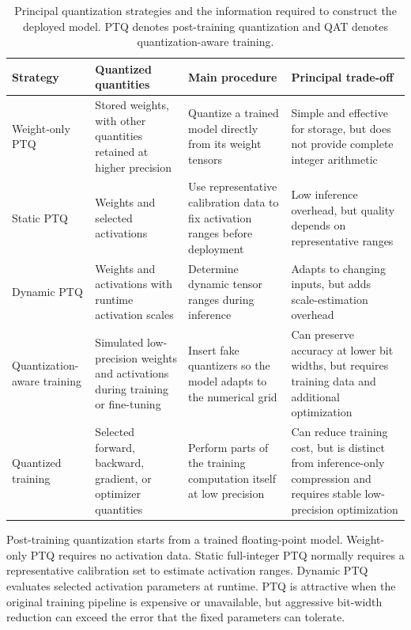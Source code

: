 \documentclass[
    a4paper,
    12pt,
    titlepage,
    bibliography=totoc,
    twoside=on,
    parskip=false,
    numbers=noenddot,
    cleardoublepage=empty,
    DIV=12,
    BCOR=12.0mm,
    headheight=36pt,
    headings=openright
]{scrreprt}
\begin{document}
\begin{table}[htbp]
    \centering
    \small
    \caption[Principal neural-network quantization strategies.]{Principal quantization strategies and the information required to construct the deployed model. PTQ denotes post-training quantization and QAT denotes quantization-aware training.}
    \label{tab:fundamental_quantization_strategies}
    \begin{tabularx}{\textwidth}{>{\raggedright\arraybackslash}p{3.0cm}>{\raggedright\arraybackslash}p{3.2cm}YY}
        \toprule
        Strategy & Quantized quantities & Main procedure & Principal trade-off \\
        \midrule
        Weight-only PTQ & Stored weights, with other quantities retained at higher precision & Quantize a trained model directly from its weight tensors & Simple and effective for storage, but does not provide complete integer arithmetic \\
        Static PTQ & Weights and selected activations & Use representative calibration data to fix activation ranges before deployment & Low inference overhead, but quality depends on representative ranges \\
        Dynamic PTQ & Weights and activations with runtime activation scales & Determine dynamic tensor ranges during inference & Adapts to changing inputs, but adds scale-estimation overhead \\
        Quantization-aware training & Simulated low-precision weights and activations during training or fine-tuning & Insert fake quantizers so the model adapts to the numerical grid & Can preserve accuracy at lower bit widths, but requires training data and additional optimization \\
        Quantized training & Selected forward, backward, gradient, or optimizer quantities & Perform parts of the training computation itself at low precision & Can reduce training cost, but is distinct from inference-only compression and requires stable low-precision optimization \\
        \bottomrule
    \end{tabularx}
\end{table}

Post-training quantization starts from a trained floating-point model. Weight-only PTQ requires no activation data. Static full-integer PTQ normally requires a representative calibration set to estimate activation ranges. Dynamic PTQ evaluates selected activation parameters at runtime. PTQ is attractive when the original training pipeline is expensive or unavailable, but aggressive bit-width reduction can exceed the error that the fixed parameters can tolerate.\autocite{bannerPostTraining4bit2019,nagelAdaptiveRoundingPosttraining2020}
\end{document}
